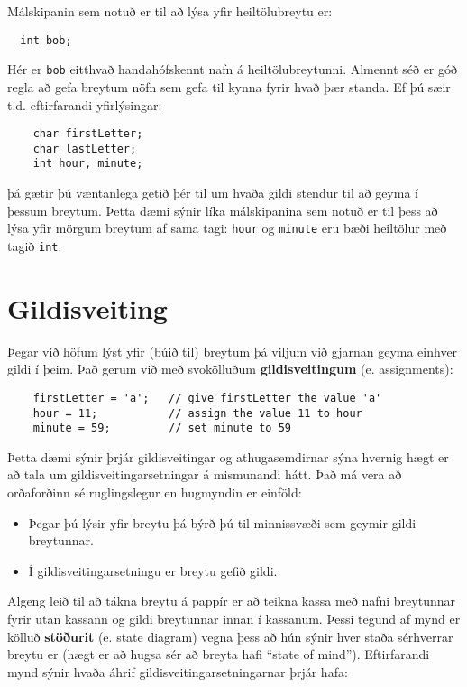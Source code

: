 
Málskipanin sem notuð er til að lýsa yfir heiltölubreytu er: 

\begin{verbatim}
  int bob;
\end{verbatim}
%
Hér er {\tt bob} eitthvað handahófskennt nafn á heiltölubreytunni.
Almennt séð er góð regla að gefa breytum nöfn sem gefa til kynna fyrir hvað þær standa.
Ef þú sæir t.d. eftirfarandi yfirlýsingar: 

\begin{verbatim}
    char firstLetter;
    char lastLetter;
    int hour, minute;
\end{verbatim}
%
þá gætir þú væntanlega getið þér til um hvaða gildi stendur til að geyma í þessum breytum.
Þetta dæmi sýnir líka málskipanina sem notuð er til þess að lýsa yfir mörgum breytum af sama tagi: {\tt hour} og {\tt minute}
eru bæði heiltölur með tagið {\tt int}.

\section{Gildisveiting}

Þegar við höfum lýst yfir (búið til) breytum þá viljum við gjarnan geyma einhver gildi í þeim.
Það gerum við með svokölluðum {\bf gildisveitingum} (e. assignments):

\begin{verbatim}
    firstLetter = 'a';   // give firstLetter the value 'a'
    hour = 11;           // assign the value 11 to hour
    minute = 59;         // set minute to 59
\end{verbatim}
%
Þetta dæmi sýnir þrjár gildisveitingar og athugasemdirnar sýna hvernig hægt er að tala um gildisveitingarsetningar á mismunandi hátt.
Það má vera að orðaforðinn sé ruglingslegur en hugmyndin er einföld: 

\begin{itemize}
\item Þegar þú lýsir yfir breytu þá býrð þú til minnissvæði sem geymir gildi breytunnar.
\item Í gildisveitingarsetningu er breytu gefið gildi. 
\end{itemize}

Algeng leið til að tákna breytu á pappír er að teikna kassa
með nafni breytunnar fyrir utan kassann og gildi breytunnar innan í kassanum.
Þessi tegund af mynd er kölluð {\bf stöðurit} (e. state diagram) vegna þess að hún sýnir hver staða sérhverrar breytu er (hægt er að hugsa sér að breyta hafi ``state of mind'').
Eftirfarandi mynd sýnir hvaða áhrif gildisveitingarsetningarnar þrjár hafa: 

